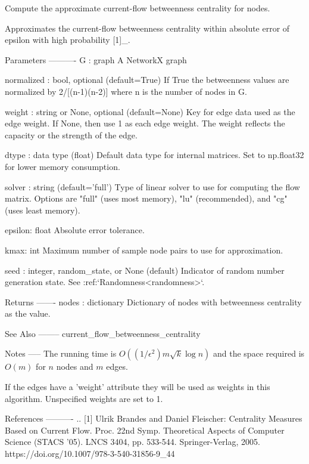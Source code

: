 \begin{DoxyVerb}Compute the approximate current-flow betweenness centrality for nodes.

Approximates the current-flow betweenness centrality within absolute
error of epsilon with high probability [1]_.


Parameters
----------
G : graph
  A NetworkX graph

normalized : bool, optional (default=True)
  If True the betweenness values are normalized by 2/[(n-1)(n-2)] where
  n is the number of nodes in G.

weight : string or None, optional (default=None)
  Key for edge data used as the edge weight.
  If None, then use 1 as each edge weight.
  The weight reflects the capacity or the strength of the
  edge.

dtype : data type (float)
  Default data type for internal matrices.
  Set to np.float32 for lower memory consumption.

solver : string (default='full')
   Type of linear solver to use for computing the flow matrix.
   Options are "full" (uses most memory), "lu" (recommended), and
   "cg" (uses least memory).

epsilon: float
    Absolute error tolerance.

kmax: int
   Maximum number of sample node pairs to use for approximation.

seed : integer, random_state, or None (default)
    Indicator of random number generation state.
    See :ref:`Randomness<randomness>`.

Returns
-------
nodes : dictionary
   Dictionary of nodes with betweenness centrality as the value.

See Also
--------
current_flow_betweenness_centrality

Notes
-----
The running time is $O((1/\epsilon^2)m{\sqrt k} \log n)$
and the space required is $O(m)$ for $n$ nodes and $m$ edges.

If the edges have a 'weight' attribute they will be used as
weights in this algorithm.  Unspecified weights are set to 1.

References
----------
.. [1] Ulrik Brandes and Daniel Fleischer:
   Centrality Measures Based on Current Flow.
   Proc. 22nd Symp. Theoretical Aspects of Computer Science (STACS '05).
   LNCS 3404, pp. 533-544. Springer-Verlag, 2005.
   https://doi.org/10.1007/978-3-540-31856-9_44
\end{DoxyVerb}
 \mbox{\label{namespacenetworkx_1_1algorithms_1_1centrality_1_1current__flow__betweenness_a8664ba78d7d3b03a17068ced8fa35c7a}} 
